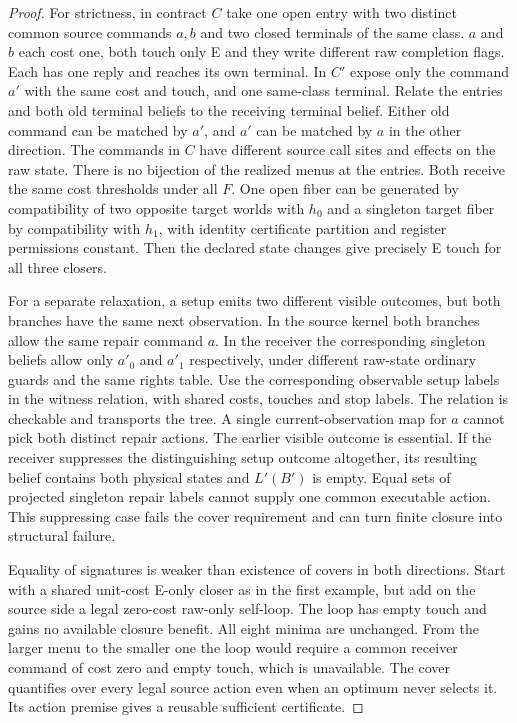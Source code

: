 \begin{proof}
For strictness, in contract \(C\) take one open entry with two distinct common source commands \(a,b\) and two closed terminals of the same class. \(a\) and \(b\) each cost one, both touch only E and they write different raw completion flags. Each has one reply and reaches its own terminal. In \(C'\) expose only the command \(a'\) with the same cost and touch, and one same-class terminal. Relate the entries and both old terminal beliefs to the receiving terminal belief. Either old command can be matched by \(a'\), and \(a'\) can be matched by \(a\) in the other direction. The commands in \(C\) have different source call sites and effects on the raw state. There is no bijection of the realized menus at the entries. Both receive the same cost thresholds under all \(F\). One open fiber can be generated by compatibility of two opposite target worlds with \(h_0\) and a singleton target fiber by compatibility with \(h_1\), with identity certificate partition and register permissions constant. Then the declared state changes give precisely E touch for all three closers.

For a separate relaxation, a setup emits two different visible outcomes, but both branches have the same next observation. In the source kernel both branches allow the same repair command \(a\). In the receiver the corresponding singleton beliefs allow only \(a'_0\) and \(a'_1\) respectively, under different raw-state ordinary guards and the same rights table. Use the corresponding observable setup labels in the witness relation, with shared costs, touches and stop labels. The relation is checkable and transports the tree. A single current-observation map for \(a\) cannot pick both distinct repair actions. The earlier visible outcome is essential. If the receiver suppresses the distinguishing setup outcome altogether, its resulting belief contains both physical states and \(L'(B')\) is empty. Equal sets of projected singleton repair labels cannot supply one common executable action. This suppressing case fails the cover requirement and can turn finite closure into structural failure.

Equality of signatures is weaker than existence of covers in both directions. Start with a shared unit-cost E-only closer as in the first example, but add on the source side a legal zero-cost raw-only self-loop. The loop has empty touch and gains no available closure benefit. All eight minima are unchanged. From the larger menu to the smaller one the loop would require a common receiver command of cost zero and empty touch, which is unavailable. The cover quantifies over every legal source action even when an optimum never selects it. Its action premise gives a reusable sufficient certificate.


\end{proof}
